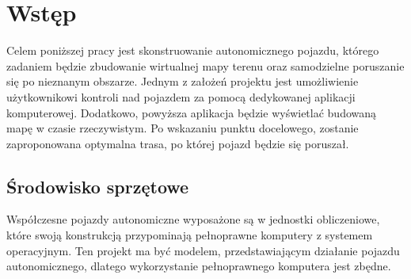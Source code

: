\section{Wstęp}
    Celem poniższej pracy jest skonstruowanie autonomicznego pojazdu, którego zadaniem będzie zbudowanie wirtualnej mapy terenu oraz samodzielne poruszanie się po nieznanym obszarze.
    Jednym z założeń projektu jest umożliwienie użytkownikowi kontroli nad pojazdem za pomocą dedykowanej aplikacji komputerowej.
    Dodatkowo, powyższa aplikacja będzie wyświetlać budowaną mapę w czasie rzeczywistym.
    Po wskazaniu punktu docelowego, zostanie zaproponowana optymalna trasa, po której pojazd będzie się poruszał.


    \subsection{Środowisko sprzętowe}
        Współczesne pojazdy autonomiczne wyposażone są w jednostki obliczeniowe, które swoją konstrukcją przypominają pełnoprawne komputery z systemem operacyjnym.
        Ten projekt ma być modelem,  przedstawiającym działanie pojazdu autonomicznego, dlatego wykorzystanie pełnoprawnego komputera jest zbędne.

